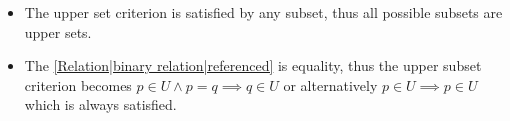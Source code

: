 \begin{itemize}
    \item The upper set criterion is satisfied by any subset, thus all possible subsets are upper sets.
    \item The \ref{Relation|binary relation|referenced} is equality, thus the upper subset criterion becomes $p \in U \land p = q \implies q \in U$ or alternatively $p \in U \implies p \in U$ which is always satisfied.
  \end{itemize}